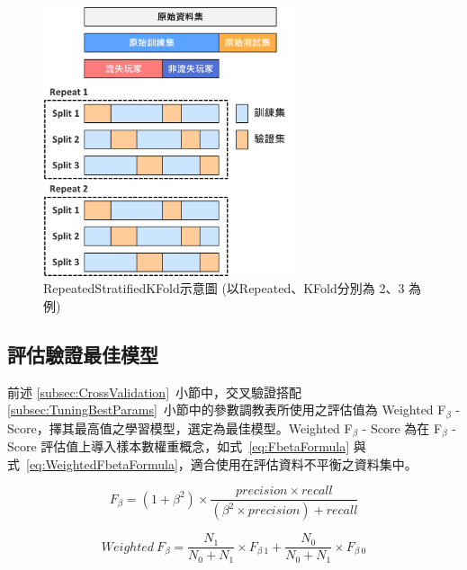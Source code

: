 \begin{figure}[!htb]
  \begin{center}
    \includegraphics[width=0.65\textwidth]{figures/Image_RepeatedStratifiedKFold.png}
    \caption[RepeatedStratifiedKFold示意圖]{RepeatedStratifiedKFold示意圖 (以Repeated、KFold分別為 2、3 為例) }
    \label{fig:Image_RepeatedStratifiedKFold}
  \end{center}
\end{figure}

\subsection{評估驗證最佳模型}
\label{subsec:EvaluateBestModel}

前述 \ref{subsec:CrossValidation}~小節中，交叉驗證搭配 \ref{subsec:TuningBestParams}~小節中的參數調教表所使用之評估值為 Weighted F$_{\beta}$ - Score，擇其最高值之學習模型，選定為最佳模型。Weighted F$_{\beta}$ - Score 為在 F$_{\beta}$ - Score 評估值上導入樣本數權重概念，如式~\ref{eq:FbetaFormula} 與式~\ref{eq:WeightedFbetaFormula}，適合使用在評估資料不平衡之資料集中。

\begin{equation}
  \label{eq:FbetaFormula}
  F_{\beta} = (1 + \beta^2) \times \frac{precision \times recall}{(\beta^2 \times precision) + recall}
\end{equation}

\begin{equation}
  \label{eq:WeightedFbetaFormula}
  Weighted\ F_{\beta} = \frac{N_1}{N_0 + N_1} \times F_{\beta\ 1} + \frac{N_0}{N_0 + N_1} \times F_{\beta\ 0}
\end{equation}

